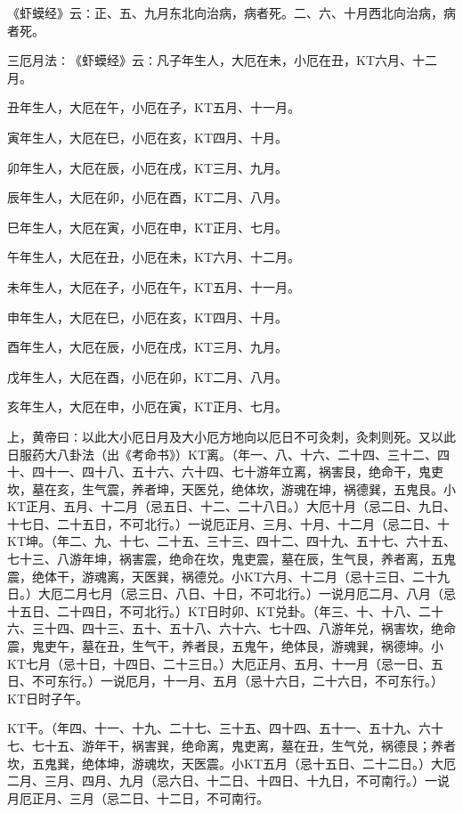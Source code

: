 \documentclass[a4paper,12pt,UTF8,twoside]{ctexbook}
\begin{document}
《虾蟆经》云∶正、五、九月东北向治病，病者死。二、六、十月西北向治病，病者死。

三厄月法∶《虾蟆经》云∶凡子年生人，大厄在未，小厄在丑，KT六月、十二月。

丑年生人，大厄在午，小厄在子，KT五月、十一月。

寅年生人，大厄在巳，小厄在亥，KT四月、十月。

卯年生人，大厄在辰，小厄在戌，KT三月、九月。

辰年生人，大厄在卯，小厄在酉，KT二月、八月。

巳年生人，大厄在寅，小厄在申，KT正月、七月。

午年生人，大厄在丑，小厄在未，KT六月、十二月。

未年生人，大厄在子，小厄在午，KT五月、十一月。

申年生人，大厄在巳，小厄在亥，KT四月、十月。

酉年生人，大厄在辰，小厄在戌，KT三月、九月。

戊年生人，大厄在酉，小厄在卯，KT二月、八月。

亥年生人，大厄在申，小厄在寅，KT正月、七月。

上，黄帝曰∶以此大小厄日月及大小厄方地向以厄日不可灸刺，灸刺则死。又以此日服药大八卦法（出《考命书》）KT离。（年一、八、十六、二十四、三十二、四十、四十一、四十八、五十六、六十四、七十游年立离，祸害艮，绝命干，鬼吏坎，墓在亥，生气震，养者坤，天医兑，绝体坎，游魂在坤，祸德巽，五鬼艮。小KT正月、五月、十二月（忌五日、十二、二十八日。）大厄十月（忌二日、九日、十七日、二十五日，不可北行。）一说厄正月、三月、十月、十二月（忌二日、十KT坤。（年二、九、十七、二十五、三十三、四十二、四十九、五十七、六十五、七十三、八游年坤，祸害震，绝命在坎，鬼吏震，墓在辰，生气艮，养者离，五鬼震，绝体干，游魂离，天医巽，祸德兑。小KT六月、十二月（忌十三日、二十九日。）大厄二月七月（忌三日、八日、十日，不可北行。）一说月厄二月、八月（忌十五日、二十四日，不可北行。）KT日时卯、KT兑卦。（年三、十、十八、二十六、三十四、四十三、五十、五十八、六十六、七十四、八游年兑，祸害坎，绝命震，鬼吏午，墓在丑，生气干，养者艮，五鬼午，绝体艮，游魂巽，祸德坤。小KT七月（忌十日，十四日、二十三日。）大厄正月、五月、十一月（忌一日、五日、不可东行。）一说厄月，十一月、五月（忌十六日，二十六日，不可东行。）KT日时子午。

KT干。（年四、十一、十九、二十七、三十五、四十四、五十一、五十九、六十七、七十五、游年干，祸害巽，绝命离，鬼吏离，墓在丑，生气兑，祸德艮；养者坎，五鬼巽，绝体坤，游魂坎，天医震。小KT五月（忌十五日、二十二日。）大厄二月、三月、四月、九月（忌六日、十二日、十四日、十九日，不可南行。）一说月厄正月、三月（忌二日、十二日，不可南行。
\end{document}
